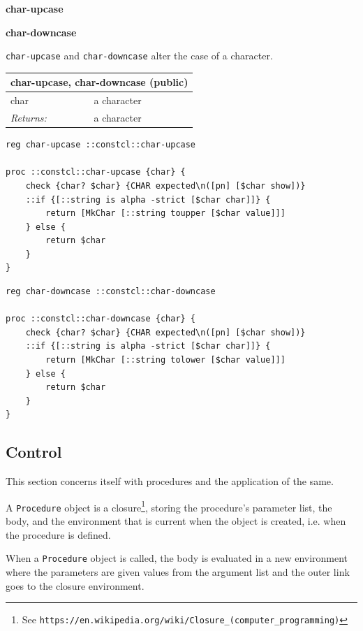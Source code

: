 \documentclass[twoside,9pt]{report}
\begin{document}
\textbf{char-upcase}


\textbf{char-downcase}


\texttt{char-upcase} and \texttt{char-downcase} alter the case of a character.

\begin{tabular}{ |l l| }
\hline
\multicolumn{2}{|l|}{char-upcase, char-downcase (public)} \\
\hline
char & a character \\
\textit{Returns:} & a character \\
\hline
\end{tabular}

\noindent\makebox[\linewidth]{\rule{\linewidth}{0.4pt}}
\begin{lstlisting}
reg char-upcase ::constcl::char-upcase
 
proc ::constcl::char-upcase {char} {
    check {char? $char} {CHAR expected\n([pn] [$char show])}
    ::if {[::string is alpha -strict [$char char]]} {
        return [MkChar [::string toupper [$char value]]]
    } else {
        return $char
    }
}
\end{lstlisting}
\noindent\makebox[\linewidth]{\rule{\linewidth}{0.4pt}}
\noindent\makebox[\linewidth]{\rule{\linewidth}{0.4pt}}
\begin{lstlisting}
reg char-downcase ::constcl::char-downcase
 
proc ::constcl::char-downcase {char} {
    check {char? $char} {CHAR expected\n([pn] [$char show])}
    ::if {[::string is alpha -strict [$char char]]} {
        return [MkChar [::string tolower [$char value]]]
    } else {
        return $char
    }
}
\end{lstlisting}
\noindent\makebox[\linewidth]{\rule{\linewidth}{0.4pt}}
\subsection{Control}
\label{control}

This section concerns itself with procedures and the application of the same.


A \texttt{Procedure} object is a closure\footnote{See \texttt{https://en.wikipedia.org/wiki/Closure\_(computer\_programming)}}, storing the procedure's parameter list, the body, and the environment that is current when the object is created, i.e. when the procedure is defined.


When a \texttt{Procedure} object is called, the body is evaluated in a new environment where the parameters are given values from the argument list and the outer link goes to the closure environment.
\end{document}
